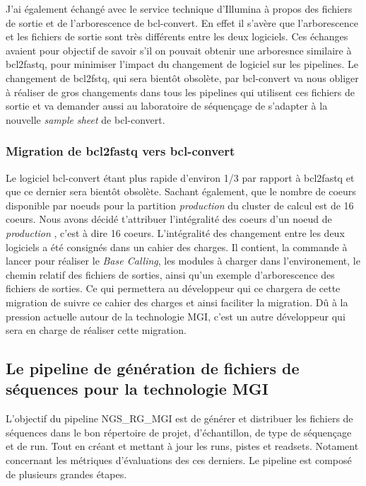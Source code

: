 J'ai également échangé avec le service technique d'Illumina à propos des fichiers de sortie et de l'arborescence de bcl-convert. En effet il s'avère que l'arborescence et les fichiers de sortie sont très différents entre les deux logiciels. Ces échanges avaient pour objectif de savoir s'il on pouvait obtenir une arboresnce similaire à bcl2fastq, pour minimiser l'impact du changement de logiciel sur les pipelines. Le changement de bcl2fstq, qui sera bientôt obsolète, par bcl-convert va nous obliger à réaliser de gros changements dans tous les pipelines qui utilisent ces fichiers de sortie et va demander aussi au laboratoire de séquençage de s'adapter à la nouvelle \emph{sample sheet} de bcl-convert.

\subsubsection{Migration de bcl2fastq vers bcl-convert}
Le logiciel bcl-convert étant plus rapide d'environ 1/3 par rapport à bcl2fastq et que ce dernier sera bientôt obsolète. Sachant également, que le nombre de coeurs disponible par noeuds pour la partition \og \emph{production} \fg{}du cluster de calcul est de 16 coeurs. Nous avons décidé t'attribuer l'intégralité des coeurs d'un noeud de \og\emph{production} \fg{}, c'est à dire 16 coeurs. L'intégralité des changement entre les deux logiciels a été consignés dans un cahier des charges. Il contient, la commande à lancer pour réaliser le \emph{Base Calling}, les modules à charger dans l'environement, le chemin relatif des fichiers de sorties, ainsi qu'un exemple d'arborescence des fichiers de sorties. Ce qui permettera au développeur qui ce chargera de cette migration de suivre ce cahier des charges et ainsi faciliter la migration. Dû à la pression actuelle autour de la technologie MGI, c'est un autre développeur qui sera en charge de réaliser cette migration.


\subsection{Le pipeline de génération de fichiers de séquences pour la technologie MGI}
L'objectif du pipeline NGS\_RG\_MGI est de générer et distribuer les fichiers de séquences dans le bon répertoire de projet, d'échantillon, de type de séquençage et de run.
Tout en créant et mettant à jour les runs, pistes et readsets.
Notament concernant les métriques d'évaluations des ces derniers.
Le pipeline est composé de plusieurs grandes étapes.

